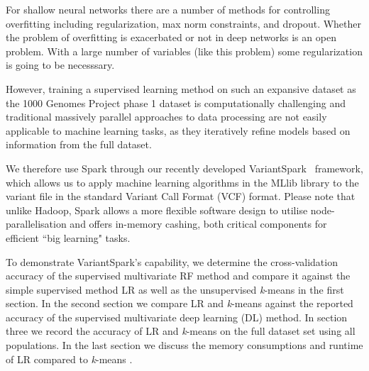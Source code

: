 \documentclass{llncs}
\newcommand{\variantSpark}{{\sc VariantSpark}}
\newcommand{\kMeans}{\textit{k}-means }
\begin{document}
{For shallow neural networks there are a number of methods for controlling overfitting including regularization, max norm
constraints, and dropout. Whether the problem of overfitting is exacerbated or not in deep networks is an open problem.
With a large number of variables (like this problem) some regularization is going to be necesssary. 

However, training a supervised learning method on such an expansive dataset as the 1000 Genomes Project phase 1 dataset is computationally 
challenging and traditional massively parallel approaches to data processing are not easily applicable to machine learning 
tasks, as they iteratively refine models based on information from the full dataset.

We therefore use {\sc Spark} through our recently developed \variantSpark~\cite{OBrien} framework, which allows us to
apply machine learning algorithms in the {\sc MLlib} library to the variant file in the standard Variant Call Format (VCF) format.  Please note
that unlike {\sc Hadoop}, {\sc Spark} allows a more flexible software design to utilise node-parallelisation and offers
in-memory cashing, both critical components for efficient ``big learning" tasks.

To demonstrate \variantSpark's capability, we determine the cross-validation accuracy of the supervised multivariate RF
method and compare it against the simple supervised method LR as well as the unsupervised \kMeans{} in the first
section.  In the second section we compare LR and \kMeans{} against the reported accuracy of the supervised multivariate
deep learning (DL) method.  In section three we record the accuracy of LR and \kMeans{} on the full dataset set using all populations.
In the last section we discuss the memory consumptions and runtime of LR compared to \kMeans{}.


}
\end{document}
